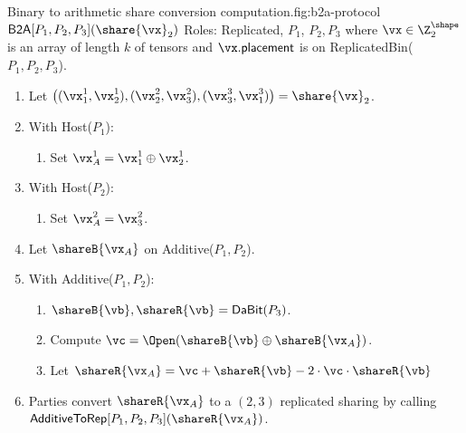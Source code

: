 \begin{Boxfig}{Binary to arithmetic share conversion computation.}{fig:b2a-protocol}
  {$\mathsf{B2A}[P_1, P_2, P_3](\share{\vx}_2)$}
  Roles: Replicated, $P_1$, $P_2, P_3$ where $\vx \in \Z_{2}^\shape$ is an array of length $k$
  of tensors and
  $\vx.\mathsf{placement}$ is on ReplicatedBin($P_1, P_2, P_3$).

  \begin{enumerate}
  \item Let $\left( (\vx_1^1, \vx_2^1), (\vx_2^2, \vx_3^2), (\vx_3^3, \vx_1^3) \right) = \share{\vx}_2$.
  \item With Host($P_1$):
  \begin{enumerate}
  \item Set $\vx_A^1 = \vx_1^1 \oplus \vx_2^1$.
  \end{enumerate}
  \item With Host($P_2$):
  \begin{enumerate}
      \item Set $\vx_A^2 = \vx_3^2$.
  \end{enumerate}
  \item Let $\shareB{\vx_A}$ on Additive($P_1, P_2$).
  \item With Additive($P_1, P_2$):
  \begin{enumerate}
      \item $\shareB{\vb}, \shareR{\vb} = \textsf{DaBit}(P_3)$.
      \item Compute $\vc = \Open( \shareB{\vb} \oplus \shareB{\vx_A})$.
      \item Let $\shareR{\vx_A} = \vc + \shareR{\vb} - 2 \cdot \vc \cdot \shareR{\vb}$
  \end{enumerate}
  \item Parties convert $\shareR{\vx_A}$ to a $(2,3)$ replicated sharing by calling
  $\textsf{AdditiveToRep}[P_1,P_2,P_3](\shareR{\vx_A})$.
\end{enumerate}

\end{Boxfig}

